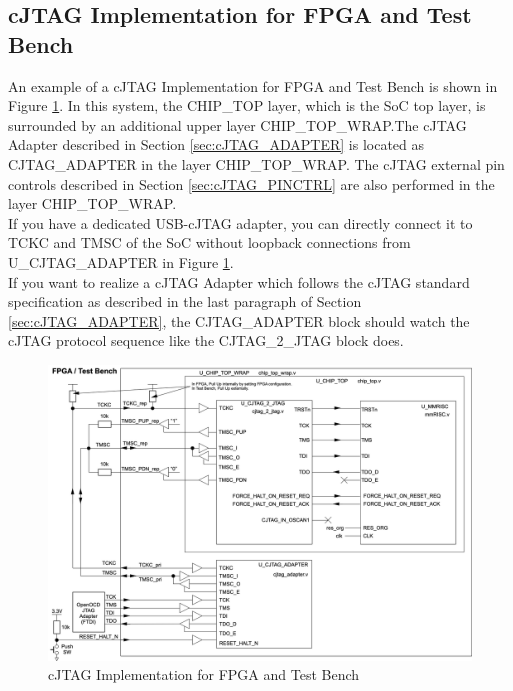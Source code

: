 \subsection{cJTAG Implementation for FPGA and Test Bench}
\label{sec:cJTAG_FPGA}


An example of a cJTAG Implementation for FPGA and Test Bench is shown in Figure \ref{fig:cJTAG_FPGA}. In this system, the CHIP\_TOP layer, which is the SoC top layer, is surrounded by an additional upper layer CHIP\_TOP\_WRAP.The cJTAG Adapter described in Section \ref{sec:cJTAG_ADAPTER} is located as CJTAG\_ADAPTER in the layer CHIP\_TOP\_WRAP. The cJTAG external pin controls described in Section \ref{sec:cJTAG_PINCTRL} are also performed in the layer CHIP\_TOP\_WRAP.\\

If you have a dedicated USB-cJTAG adapter, you can directly connect it to TCKC and TMSC of the SoC without loopback connections from U\_CJTAG\_ADAPTER in Figure \ref{fig:cJTAG_FPGA}.\\

If you want to realize a cJTAG Adapter which follows the cJTAG standard specification as described in the last paragraph of Section \ref{sec:cJTAG_ADAPTER}, the CJTAG\_ADAPTER block should watch the cJTAG protocol sequence like the CJTAG\_2\_JTAG block does.

\begin{figure}[H]
    \includegraphics[width=0.90\columnwidth]{./Figure/cJTAG_FPGA.png}
    \caption{cJTAG Implementation for FPGA and Test Bench}
    \label{fig:cJTAG_FPGA}
\end{figure}






